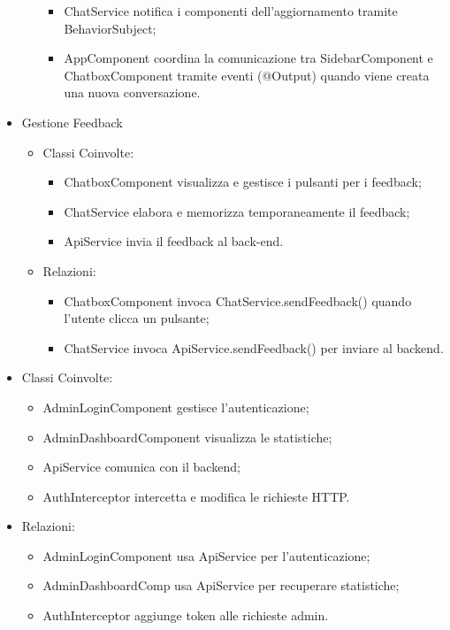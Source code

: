 \begin{itemize}
\begin{itemize}
\begin{itemize}
            \item ChatService notifica i componenti dell’aggiornamento tramite BehaviorSubject;
            \item AppComponent coordina la comunicazione tra SidebarComponent e ChatboxComponent tramite eventi (@Output) quando viene creata una nuova conversazione.
        \end{itemize}
    \end{itemize}
    \item Gestione Feedback
    \begin{itemize}
        \item Classi Coinvolte:
        \begin{itemize}
            \item ChatboxComponent visualizza e gestisce i pulsanti per i feedback;
            \item ChatService elabora e memorizza temporaneamente il feedback;
            \item ApiService invia il feedback al back-end.
        \end{itemize}
        \item Relazioni:
        \begin{itemize}
            \item ChatboxComponent invoca ChatService.sendFeedback() quando l’utente clicca un pulsante;
            \item ChatService invoca ApiService.sendFeedback() per inviare al backend.
        \end{itemize}
    \end{itemize}
\end{itemize}
\begin{itemize}
    \item Classi Coinvolte:
    \begin{itemize}
        \item AdminLoginComponent gestisce l'autenticazione;
        \item AdminDashboardComponent visualizza le statistiche;
        \item ApiService comunica con il backend;
        \item AuthInterceptor intercetta e modifica le richieste HTTP.
    \end{itemize}
    \item Relazioni:
    \begin{itemize}
        \item AdminLoginComponent usa ApiService per l’autenticazione;
        \item AdminDashboardComp usa ApiService per recuperare statistiche;
        \item AuthInterceptor aggiunge token alle richieste admin.
    \end{itemize}
\end{itemize}

